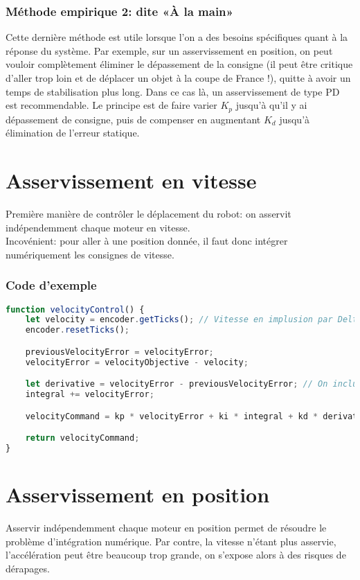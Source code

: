            \subsubsection{Méthode empirique 2: dite «À la main»}
                Cette dernière méthode est utile lorsque l'on a des besoins spécifiques quant à la réponse du système. Par exemple, sur un asservissement en position, on peut vouloir complètement éliminer le dépassement de la consigne (il peut être critique d'aller trop loin et de déplacer un objet à la coupe de France !), quitte à avoir un temps de stabilisation plus long. Dans ce cas là, un asservissement de type PD est recommendable. Le principe est de faire varier $K_p$ jusqu'à qu'il y ai dépassement de consigne, puis de compenser en augmentant $K_d$ jusqu'à élimination de l'erreur statique.

    \section{Asservissement en vitesse}
        Première manière de contrôler le déplacement du robot: on asservit indépendemment chaque moteur en vitesse.\\
        Incovénient: pour aller à une position donnée, il faut donc intégrer numériquement les consignes de vitesse.
    \subsubsection{Code d'exemple}
            \begin{lstlisting}[language=JavaScript]
function velocityControl() {
    let velocity = encoder.getTicks(); // Vitesse en implusion par DeltaT
    encoder.resetTicks();

    previousVelocityError = velocityError;
    velocityError = velocityObjective - velocity;

    let derivative = velocityError - previousVelocityError; // On inclut le 1/DeltaT dans K_d
    integral += velocityError;

    velocityCommand = kp * velocityError + ki * integral + kd * derivative;

    return velocityCommand;
}
            \end{lstlisting}

    \newpage
    \section{Asservissement en position}
        Asservir indépendemment chaque moteur en position permet de résoudre le  problème d'intégration numérique. Par contre, la vitesse n'étant plus asservie, l'accélération peut être beaucoup trop grande, on s'expose alors à des risques de dérapages.
